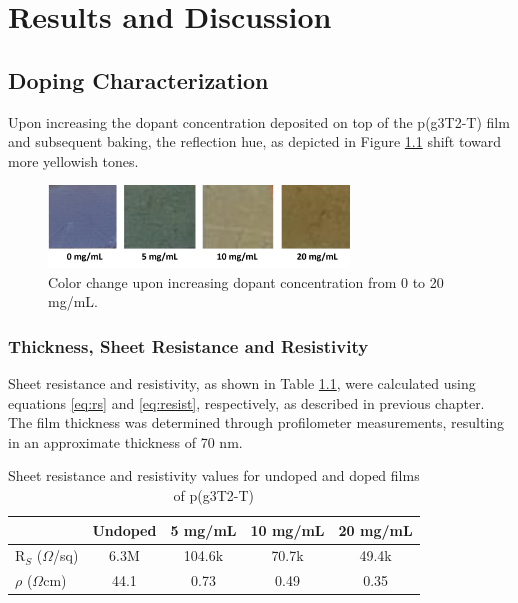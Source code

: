 \chapter{Results and Discussion} \label{cha:3}

\section{Doping Characterization}

Upon increasing the dopant concentration deposited on top of the p(g3T2-T) film and subsequent baking, the reflection hue, as depicted in Figure \ref{fig:color} shift toward more yellowish tones.

\begin{figure}[ht]
  \centering
  \includegraphics[width=8cm]{Images/pdf/doping_color.pdf}
  \caption[Color shift upon doping level increase]{Color change upon increasing dopant concentration from 0 to 20 mg/mL.
  \label{fig:color}}
\end{figure}

\subsection{Thickness, Sheet Resistance and Resistivity}

Sheet resistance and resistivity, as shown in Table \ref{tab:res}, were calculated using equations \ref{eq:rs} and \ref{eq:resist}, respectively, as described in previous chapter. The film thickness was determined through profilometer measurements, resulting in an approximate thickness of 70 nm.

\begin{table}[ht]
\centering
\caption{Sheet resistance and resistivity values for undoped and doped films of p(g3T2-T)}
\begin{tabular}{l|c|c|c|c}
& Undoped & 5 mg/mL & 10 mg/mL & 20 mg/mL \\\hline
R$_{S}$ ($\Omega$/sq) & 6.3M & 104.6k & 70.7k & 49.4k\\
$\rho$ ($\Omega$cm) & 44.1 & 0.73 & 0.49 & 0.35\\\hline
\end{tabular}
\label{tab:res}
\end{table}

